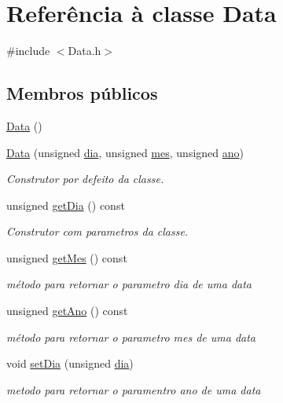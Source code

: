 \hypertarget{class_data}{\section{Referência à classe Data}
\label{class_data}
}


{\ttfamily \#include $<$Data.\+h$>$}

\subsection*{Membros públicos}
\begin{DoxyCompactItemize}
\item 
\hyperlink{class_data_af11f741cb7f587e2e495452a8905a22a}{Data} ()
\item 
\hyperlink{class_data_ab1e8f6ca4094cbf13062f243fa2bb90b}{Data} (unsigned \hyperlink{class_data_a71a904380d17858da0b902e9a2563546}{dia}, unsigned \hyperlink{class_data_a586deb479ec2031a0d3ceec8280f7706}{mes}, unsigned \hyperlink{class_data_a1811fab972bdf6ed644c4eb7412bd043}{ano})
\begin{DoxyCompactList}\small\item\em Construtor por defeito da classe. \end{DoxyCompactList}\item 
unsigned \hyperlink{class_data_a07fe748ec046cb904c6854fb8b792786}{get\+Dia} () const 
\begin{DoxyCompactList}\small\item\em Construtor com parametros da classe. \end{DoxyCompactList}\item 
unsigned \hyperlink{class_data_a070387c9894b966ec8a175e3eb3c9c06}{get\+Mes} () const 
\begin{DoxyCompactList}\small\item\em método para retornar o parametro dia de uma data \end{DoxyCompactList}\item 
unsigned \hyperlink{class_data_a31f649c5a854de4750506a163955bb0b}{get\+Ano} () const 
\begin{DoxyCompactList}\small\item\em método para retornar o parametro mes de uma data \end{DoxyCompactList}\item 
void \hyperlink{class_data_ab3ea08211198373060bfd9aa7530ddff}{set\+Dia} (unsigned \hyperlink{class_data_a71a904380d17858da0b902e9a2563546}{dia})
\begin{DoxyCompactList}\small\item\em metodo para retornar o paramentro ano de uma data \end{DoxyCompactList}\item 

\end{DoxyCompactItemize}
